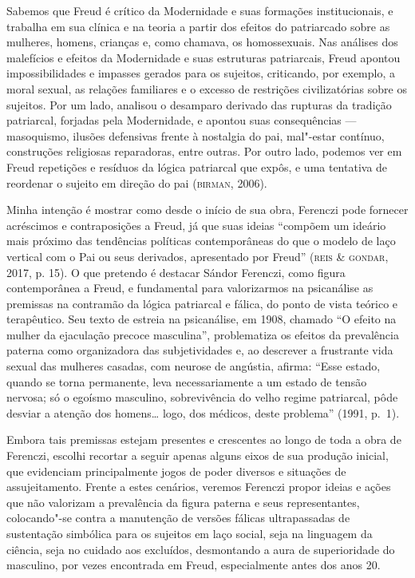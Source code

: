 Sabemos que Freud é crítico da Modernidade e suas formações
institucionais, e trabalha em sua clínica e na teoria a partir dos
efeitos do patriarcado sobre as mulheres, homens, crianças e, como
chamava, os homossexuais. Nas análises dos malefícios e efeitos da
Modernidade e suas estruturas patriarcais, Freud apontou
impossibilidades e impasses gerados para os sujeitos, criticando, por
exemplo, a moral sexual, as relações familiares e o excesso de
restrições civilizatórias sobre os sujeitos. Por um lado, analisou o
desamparo derivado das rupturas da tradição patriarcal, forjadas pela
Modernidade, e apontou suas consequências --- masoquismo, ilusões
defensivas frente à nostalgia do pai, mal"-estar contínuo, construções
religiosas reparadoras, entre outras. Por outro lado, podemos ver em
Freud repetições e resíduos da lógica patriarcal que expôs, e uma
tentativa de reordenar o sujeito em direção do pai (\textsc{birman}, 2006).

Minha intenção é mostrar como desde o início de sua obra, Ferenczi pode
fornecer acréscimos e contraposições a Freud, já que suas ideias
``compõem um ideário mais próximo das tendências políticas
contemporâneas do que o modelo de laço vertical com o Pai ou seus
derivados, apresentado por Freud'' (\textsc{reis} \& \textsc{gondar}, 2017, p. 15). O que
pretendo é destacar Sándor Ferenczi, como figura contemporânea a Freud,
e fundamental para valorizarmos na psicanálise as premissas na contramão
da lógica patriarcal e fálica, do ponto de vista teórico e terapêutico.
Seu texto de estreia na psicanálise, em 1908, chamado ``O efeito na mulher
da ejaculação precoce masculina'', problematiza os efeitos da prevalência
paterna como organizadora das subjetividades e, ao descrever a
frustrante vida sexual das mulheres casadas, com neurose de angústia,
afirma: ``Esse estado, quando se torna permanente, leva necessariamente
a um estado de tensão nervosa; só o egoísmo masculino, sobrevivência do
velho regime patriarcal, pôde desviar a atenção dos homens\ldots{} logo, dos
médicos, deste problema'' (1991, p.~1).

Embora tais premissas estejam presentes e crescentes ao longo de toda a
obra de Ferenczi, escolhi recortar a seguir apenas alguns eixos de sua
produção inicial, que evidenciam principalmente jogos de poder diversos
e situações de assujeitamento. Frente a estes cenários, veremos Ferenczi
propor ideias e ações que não valorizam a prevalência da figura paterna
e seus representantes, colocando"-se contra a manutenção de versões
fálicas ultrapassadas de sustentação simbólica para os sujeitos em laço
social, seja na linguagem da ciência, seja no cuidado aos excluídos,
desmontando a aura de superioridade do masculino, por vezes encontrada
em Freud, especialmente antes dos anos 20.

